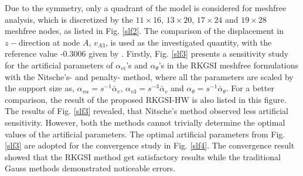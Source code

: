 Due to the symmetry, only a quadrant of the model is considered for meshfree analysis, which is discretized by the $11\times 16$, $13\times 20$, $17\times 24$ and $19\times28$ meshfree nodes, as listed in Fig. \ref{slf2}. The comparison of the displacement in $z-$direction at node $A$, $v_{A3}$, is used as the investigated quantity, with the reference value -0.3006 given by \cite{kiendl2009}. Firstly, Fig. \ref{slf3} presents a sensitivity study for the artificial parameters of $\alpha_{vi}$'s and $\alpha_\theta$'s in the RKGSI meshfree formulations with the Nitsche's- and penalty- method, where all the parameters are scaled by the support size as, $\alpha_{v\alpha} = s^{-1}\bar \alpha_v$, $\alpha_{v3} = s^{-3} \bar \alpha_v$ and $\alpha_\theta = s^{-1}\bar \alpha_\theta$. For a better comparison, the result of the proposed RKGSI-HW is also listed in this figure. The results of Fig. \ref{slf3} revealed, that Nitsche's method observed less artificial sensitivity. However, both the methods cannot trivially determine the optimal values of the artificial parameters. The optimal artificial parameters from Fig. \ref{slf3} are adopted for the convergence study in Fig. \ref{slf4}. The convergence result showed that the RKGSI method get satisfactory results while the traditional Gauss methods demonstrated noticeable errors.

